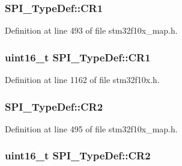 \subsubsection[{\texorpdfstring{C\+R1}{CR1}}]{ S\+P\+I\+\_\+\+Type\+Def\+::\+C\+R1}\hypertarget{struct_s_p_i___type_def_a560772c677ab406a1bc85cde0cdb715e}{}\label{struct_s_p_i___type_def_a560772c677ab406a1bc85cde0cdb715e}


Definition at line 493 of file stm32f10x\+\_\+map.\+h.

\subsubsection[{\texorpdfstring{C\+R1}{CR1}}]{ {\bf uint16\+\_\+t} S\+P\+I\+\_\+\+Type\+Def\+::\+C\+R1}\hypertarget{struct_s_p_i___type_def_a1e398155ddd013fcdd41309b4bd0bd5f}{}\label{struct_s_p_i___type_def_a1e398155ddd013fcdd41309b4bd0bd5f}


Definition at line 1162 of file stm32f10x.\+h.

\subsubsection[{\texorpdfstring{C\+R2}{CR2}}]{ S\+P\+I\+\_\+\+Type\+Def\+::\+C\+R2}\hypertarget{struct_s_p_i___type_def_aef295eda26be8d2d4c4f54d01a0f71e2}{}\label{struct_s_p_i___type_def_aef295eda26be8d2d4c4f54d01a0f71e2}


Definition at line 495 of file stm32f10x\+\_\+map.\+h.

\subsubsection[{\texorpdfstring{C\+R2}{CR2}}]{ {\bf uint16\+\_\+t} S\+P\+I\+\_\+\+Type\+Def\+::\+C\+R2}\hypertarget{struct_s_p_i___type_def_ac891e34644b8dc27bacc906cfd18b235}{}\label{struct_s_p_i___type_def_ac891e34644b8dc27bacc906cfd18b235}


